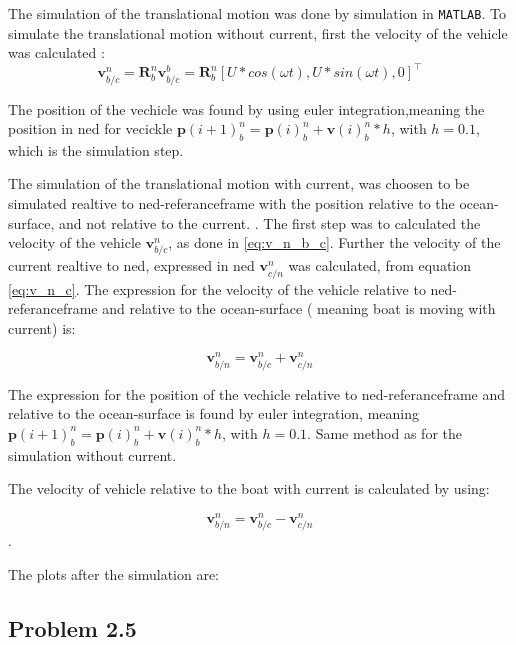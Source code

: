 The simulation of the translational motion was done by simulation in \texttt{MATLAB}. To simulate the translational motion without current, first the velocity of the vehicle was calculated :
\begin{equation}
    \mathbf{v}^n_{b/c} = \mathbf{R}^n_b \mathbf{v}^b_{b/c} = \mathbf{R}^n_b [U*cos(\omega t), U*sin(\omega t), 0]^\top
    \label{eq:v_n_b_c}
\end{equation}


 The position of the vechicle was found by using euler integration,meaning the position in ned for vecickle $\mathbf{p}(i+1)^n_b = \mathbf{p}(i)^n_b + \mathbf{v}(i)^n_b*h $, with $h = 0.1$, which is the simulation step.
 
The  simulation of  the translational motion with current, was choosen to be simulated realtive to ned-referanceframe with the position relative to the ocean-surface, and not relative to the current. . The first step was to calculated the velocity of the vehicle $\mathbf{v}^n_{b/c}$, as done in \eqref{eq:v_n_b_c}. Further the velocity of the current realtive to ned, expressed in ned $\mathbf{v}^n_{c/n}$ was calculated, from equation \eqref{eq:v_n_c}. The expression for the velocity of the vehicle relative to ned-referanceframe and relative to the ocean-surface ( meaning boat is moving with current) is:

\begin{equation}
    \mathbf{v}^n_{b/n} = \mathbf{v}^n_{b/c} + \mathbf{v}^n_{c/n}
\end{equation}

The expression for the position of the vechicle relative to ned-referanceframe and relative to the ocean-surface is found by euler integration, meaning $\mathbf{p}(i+1)^n_b = \mathbf{p}(i)^n_b + \mathbf{v}(i)^n_b*h $, with $h = 0.1$. Same method as for the simulation without current.

The velocity of vehicle relative to the boat with current is calculated by using:

\begin{equation}
    \mathbf{v}^n_{b/n} = \mathbf{v}^n_{b/c} - \mathbf{v}^n_{c/n}
\end{equation}.

The plots after the simulation are:




\subsection*{Problem 2.5}

